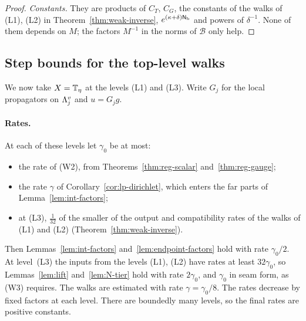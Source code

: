 \begin{proof}
\emph{Constants.} They are products of $C_T$, $C_G$, the constants of the walks of (L1), (L2) in Theorem~\ref{thm:weak-inverse}, $e^{(\kappa+\delta)\mathsf N_{\rm b}}$ and powers of $\delta^{-1}$. None of them depends on $M$; the factors $M^{-1}$ in the norms of $\mathcal B$ only help.
\end{proof}

\subsection{Step bounds for the top-level walks}\label{ss:44.4}

We now take $X=\mathbb T_\eta$ at the levels (L1) and (L3). Write $G_j$ for the local propagators on $\Lambda^v_j$ and $u=G_jg$.

\paragraph{Rates.} At each of these levels let $\gamma_0$ be at most:
\begin{itemize}
\item the rate of (W2), from Theorems~\ref{thm:reg-scalar} and~\ref{thm:reg-gauge};
\item the rate $\gamma$ of Corollary~\ref{cor:lp-dirichlet}, which enters the far parts of Lemma~\ref{lem:int-factors};
\item at (L3), $\frac1{32}$ of the smaller of the output and compatibility rates of the walks of (L1) and (L2) (Theorem~\ref{thm:weak-inverse}).
\end{itemize}
Then Lemmas~\ref{lem:int-factors} and~\ref{lem:endpoint-factors} hold with rate $\gamma_0/2$. At level~(L3) the inputs from the levels (L1), (L2) have rates at least $32\gamma_0$, so Lemmas~\ref{lem:lift} and~\ref{lem:N-tier} hold with rate $2\gamma_0$, and $\gamma_0$ in seam form, as (W3) requires. The walks are estimated with rate $\gamma=\gamma_0/8$. The rates decrease by fixed factors at each level. There are boundedly many levels, so the final rates are positive constants.


